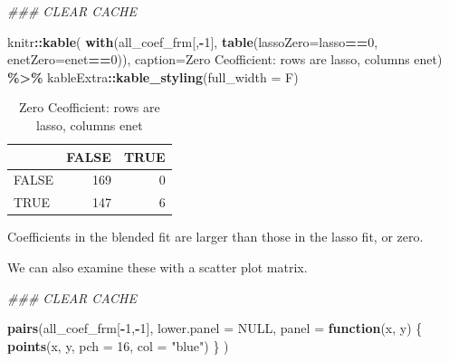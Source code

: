 \documentclass[
]{book}
\newenvironment{Shaded}{\begin{snugshade}}{\end{snugshade}}
\newcommand{\CommentTok}[1]{\textcolor[rgb]{0.56,0.35,0.01}{\textit{#1}}}
\newcommand{\ControlFlowTok}[1]{\textcolor[rgb]{0.13,0.29,0.53}{\textbf{#1}}}
\newcommand{\DataTypeTok}[1]{\textcolor[rgb]{0.13,0.29,0.53}{#1}}
\newcommand{\DecValTok}[1]{\textcolor[rgb]{0.00,0.00,0.81}{#1}}
\newcommand{\KeywordTok}[1]{\textcolor[rgb]{0.13,0.29,0.53}{\textbf{#1}}}
\newcommand{\NormalTok}[1]{#1}
\newcommand{\OperatorTok}[1]{\textcolor[rgb]{0.81,0.36,0.00}{\textbf{#1}}}
\newcommand{\OtherTok}[1]{\textcolor[rgb]{0.56,0.35,0.01}{#1}}
\newcommand{\StringTok}[1]{\textcolor[rgb]{0.31,0.60,0.02}{#1}}
\begin{document}
\begin{Shaded}
\begin{Highlighting}[]
\CommentTok{\#\#\# CLEAR CACHE}

\NormalTok{knitr}\OperatorTok{::}\KeywordTok{kable}\NormalTok{(}
\KeywordTok{with}\NormalTok{(all\_coef\_frm[,}\OperatorTok{{-}}\DecValTok{1}\NormalTok{], }\KeywordTok{table}\NormalTok{(}\DataTypeTok{lassoZero=}\NormalTok{lasso}\OperatorTok{==}\DecValTok{0}\NormalTok{, }\DataTypeTok{enetZero=}\NormalTok{enet}\OperatorTok{==}\DecValTok{0}\NormalTok{)),}
 \DataTypeTok{caption=}\StringTok{\textquotesingle{}Zero Ceofficient: rows are lasso, columns enet\textquotesingle{}}\NormalTok{) }\OperatorTok{\%>\%}
\StringTok{  }\NormalTok{kableExtra}\OperatorTok{::}\KeywordTok{kable\_styling}\NormalTok{(}\DataTypeTok{full\_width =}\NormalTok{ F)}
\end{Highlighting}
\end{Shaded}

\begin{table}

\caption{\label{tab:brcaRna-glmnetFit-zreros}Zero Ceofficient: rows are lasso, columns enet}
\centering
\begin{tabular}[t]{l|r|r}
\hline
  & FALSE & TRUE\\
\hline
FALSE & 169 & 0\\
\hline
TRUE & 147 & 6\\
\hline
\end{tabular}
\end{table}

Coefficients in the blended fit are larger than those in the
lasso fit, or zero.

We can also examine these with a scatter plot matrix.

\begin{Shaded}
\begin{Highlighting}[]
\CommentTok{\#\#\# CLEAR CACHE}


\KeywordTok{pairs}\NormalTok{(all\_coef\_frm[}\OperatorTok{{-}}\DecValTok{1}\NormalTok{,}\OperatorTok{{-}}\DecValTok{1}\NormalTok{],}
  \DataTypeTok{lower.panel =} \OtherTok{NULL}\NormalTok{,}
  \DataTypeTok{panel =} \ControlFlowTok{function}\NormalTok{(x, y) \{}
    \KeywordTok{points}\NormalTok{(x, y, }\DataTypeTok{pch =} \DecValTok{16}\NormalTok{, }\DataTypeTok{col =} \StringTok{"blue"}\NormalTok{)}
\NormalTok{  \}}
\NormalTok{)}
\end{Highlighting}
\end{Shaded}
\end{document}
